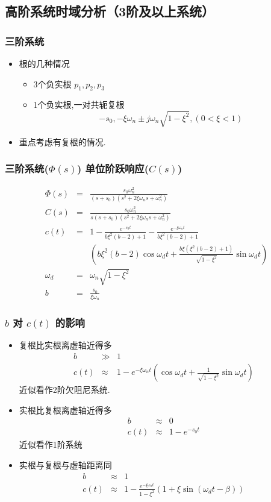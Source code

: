 \documentclass{article}
\begin{document}
\subsection{高阶系统时域分析（3阶及以上系统）}
\label{sec-1-4}
\begin{frame}
\frametitle{三阶系统}
\label{sec-1-4-1}

\begin{itemize}
\item <2-> 根的几种情况
\begin{itemize}
\item <3-> 3个负实根 $p_1,p_2,p_3$
\item <4-> 1个负实根,一对共轭复根 
       \[-s_0,-\xi\omega_n\pm j\omega_n\sqrt{1-\xi^2},(0<\xi<1)\]
\end{itemize}
\item <5-> 重点考虑有复根的情况.
\end{itemize}
\end{frame}
\begin{frame}
\frametitle{三阶系统($\Phi(s)$) 单位阶跃响应($C(s)$)}
\label{sec-1-4-2}

\begin{eqnarray*}
 \Phi(s) & = & \frac{s_0\omega_n^2}{(s+s_0)(s^2+2\xi\omega_n s+\omega_n^2)} \\
 C(s) &=& \frac{s_0\omega_n^2}{s(s+s_0)(s^2+2\xi\omega_n s+\omega_n^2)} \\
 c(t) &=& 1-\frac{e^{-s_0 t}}{b\xi^2(b-2)+1}-\frac{e^{-\xi\omega_n t}}{b\xi^2(b-2)+1} \\
     & & \left(b\xi^2(b-2)\cos\omega_d t + \frac{b\xi(\xi^2(b-2)+1)}{\sqrt{1-\xi^2}}\sin\omega_d t\right) \\
 \omega_d &=& \omega_n\sqrt{1-\xi^2} \\
 b &=& \frac{s_0}{\xi\omega_n}
\end{eqnarray*}
\end{frame}
\begin{frame}
\frametitle{$b$ 对 $c(t)$ 的影响}
\label{sec-1-4-3}


\begin{itemize}
\item <2->复根比实根离虚轴近得多
      \begin{eqnarray*}
      b & \gg & 1\\
      c(t) &\approx & 1-e^{-\xi\omega_n t}\left(\cos\omega_d t + \frac{1}{\sqrt{1-\xi^2}}\sin\omega_d t\right) 
      \end{eqnarray*}
      近似看作2阶欠阻尼系统.
\item <3->实根比复根离虚轴近得多
      \begin{eqnarray*}
      b & \approx & 0\\
      c(t) &\approx & 1-e^{-s_0 t}
      \end{eqnarray*}
      近似看作1阶系统
\item <4->实根与复根与虚轴距离同
      \begin{eqnarray*}
      b & \approx & 1\\
      c(t) &\approx & 1-\frac{e^{-\xi\omega_n t}}{1-\xi^2}\left(1+\xi\sin(\omega_d t-\beta)\right) 
      \end{eqnarray*}
\end{itemize}
\end{frame}
\end{document}
